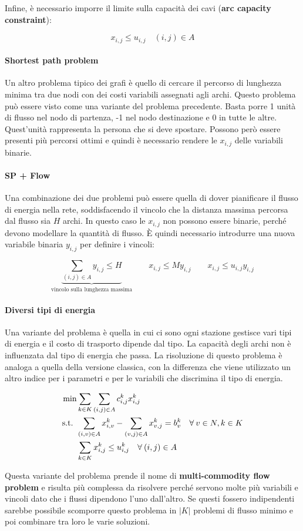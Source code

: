 \noindent Infine, è necessario imporre il limite sulla capacità dei cavi (\textbf{arc capacity constraint}):

$$
x_{i,j} \leq u_{i,j} \quad (i,j) \in A
$$

\paragraph{Shortest path problem} Un altro problema tipico dei grafi è quello di cercare il percorso di lunghezza minima tra due nodi con dei costi variabili assegnati agli archi.
Questo problema può essere visto come una variante del problema precedente. Basta porre 1 unità di flusso nel nodo di partenza, -1 nel nodo destinazione e 0 in tutte le altre. Quest'unità rappresenta la persona che si deve spostare.
Possono però essere presenti più percorsi ottimi e quindi è necessario rendere le $x_{i,j}$ delle variabili binarie.

\paragraph{SP + Flow} Una combinazione dei due problemi può essere quella di dover pianificare il flusso di energia nella rete, soddisfacendo il vincolo che la distanza massima percorsa dal flusso sia $H$ archi.
In questo caso le $x_{i,j}$ non possono essere binarie, perché devono modellare la quantità di flusso. \`E quindi necessario introdurre una nuova variabile binaria $y_{i,j}$ per definire i vincoli:

$$
\underbrace{\sum\limits_{(i,j) \in A} y_{i,j} \leq H}_{\text{vincolo sulla lunghezza massima}} \qquad x_{i,j}\leq M y_{i,j} \qquad x_{i,j} \leq u_{i,j} y_{i,j}
$$

\paragraph{Diversi tipi di energia} Una variante del problema è quella in cui ci sono ogni stazione gestisce vari tipi di energia e il costo di trasporto dipende dal tipo. La capacità degli archi non è influenzata dal tipo di energia che passa.
La risoluzione di questo problema è analoga a quella della versione classica, con la differenza che viene utilizzato un altro indice per i parametri e per le variabili che discrimina il tipo di energia.

\begin{align*}
	\min & \sum\limits_{k \in K}\sum\limits_{(i,j) \in A} c_{i,j}^k x_{i,j}^k \\
	\text{s.t. } & \sum\limits_{(i,v) \in A}x_{i,v}^k - \sum\limits_{(v,j) \in A}x_{v,j}^k = b_{v}^k \quad\forall \: v \in N, k \in K\\
	& \sum\limits_{k \in K} x_{i,j}^k \leq u_{i,j}^k \quad\forall \: (i,j) \in A
\end{align*}

\noindent Questa variante del problema prende il nome di \textbf{multi-commodity flow problem} e risulta più complessa da risolvere perché servono molte più variabili e vincoli dato che i flussi dipendono l'uno dall'altro. Se questi fossero indipendenti sarebbe possibile scomporre questo problema in $|K|$ problemi di flusso minimo e poi combinare tra loro le varie soluzioni.
